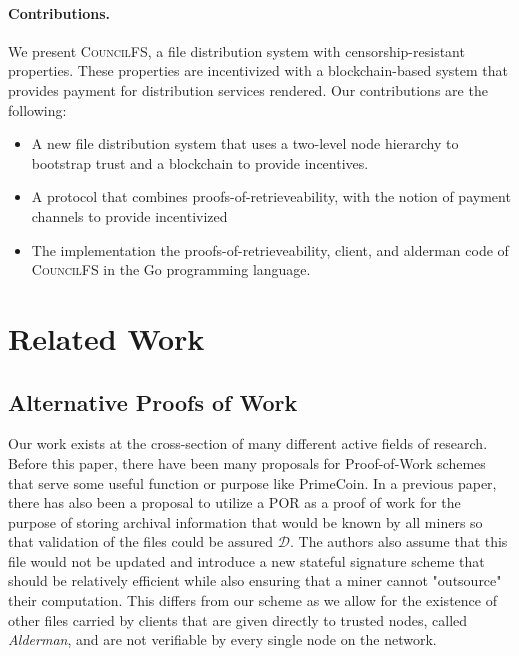 \documentclass{article}
\begin{document}
\paragraph{Contributions.} We present \textsc{CouncilFS}, a file distribution
system with censorship-resistant properties. These properties are incentivized
with a blockchain-based system that provides payment for distribution services
rendered. Our contributions are the following:
\begin{itemize}
\item A new file distribution system that uses a two-level node hierarchy to
  bootstrap trust and a blockchain to provide incentives.
\item A protocol that combines proofs-of-retrieveability, with the
  notion of payment channels to provide incentivized 
\item The implementation the proofs-of-retrieveability, client, and alderman code of
  \textsc{CouncilFS} in the Go programming language. 
\end{itemize}


\section{Related Work}
\subsection{Alternative Proofs of Work}
Our work exists at the cross-section of many different active fields of research. Before this paper, there have been many proposals for Proof-of-Work schemes that serve some useful function or purpose like PrimeCoin. In a previous paper, there has also been a proposal to utilize a POR as a proof of work for the purpose of storing archival information that would be known by all miners so that validation of the files could be assured $\mathcal{D}$. The authors also assume that this file would not be updated and introduce a new stateful signature scheme that should be relatively efficient while also ensuring that a miner cannot "outsource" their computation. This differs from our scheme as we allow for the existence of other files carried by clients that are given directly to trusted nodes, called \emph{Alderman}, and are not verifiable by every single node on the network.\\
\end{document}
